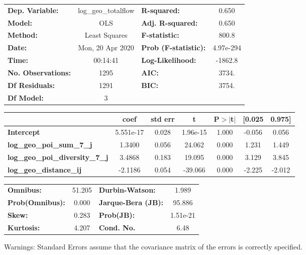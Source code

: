 \begin{center}
\begin{tabular}{lclc}
\toprule
\textbf{Dep. Variable:}                 & log\_geo\_totalflow & \textbf{  R-squared:         } &     0.650   \\
\textbf{Model:}                         &         OLS         & \textbf{  Adj. R-squared:    } &     0.650   \\
\textbf{Method:}                        &    Least Squares    & \textbf{  F-statistic:       } &     800.8   \\
\textbf{Date:}                          &   Mon, 20 Apr 2020  & \textbf{  Prob (F-statistic):} & 4.97e-294   \\
\textbf{Time:}                          &       00:14:41      & \textbf{  Log-Likelihood:    } &   -1862.8   \\
\textbf{No. Observations:}              &          1295       & \textbf{  AIC:               } &     3734.   \\
\textbf{Df Residuals:}                  &          1291       & \textbf{  BIC:               } &     3754.   \\
\textbf{Df Model:}                      &             3       & \textbf{                     } &             \\
\bottomrule
\end{tabular}
\begin{tabular}{lcccccc}
                                        & \textbf{coef} & \textbf{std err} & \textbf{t} & \textbf{P$> |$t$|$} & \textbf{[0.025} & \textbf{0.975]}  \\
\midrule
\textbf{Intercept}                      &    5.551e-17  &        0.028     &  1.96e-15  &         1.000        &       -0.056    &        0.056     \\
\textbf{log\_geo\_poi\_sum\_7\_j}       &       1.3400  &        0.056     &    24.062  &         0.000        &        1.231    &        1.449     \\
\textbf{log\_geo\_poi\_diversity\_7\_j} &       3.4868  &        0.183     &    19.095  &         0.000        &        3.129    &        3.845     \\
\textbf{log\_geo\_distance\_ij}         &      -2.1186  &        0.054     &   -39.066  &         0.000        &       -2.225    &       -2.012     \\
\bottomrule
\end{tabular}
\begin{tabular}{lclc}
\textbf{Omnibus:}       & 51.205 & \textbf{  Durbin-Watson:     } &    1.989  \\
\textbf{Prob(Omnibus):} &  0.000 & \textbf{  Jarque-Bera (JB):  } &   95.886  \\
\textbf{Skew:}          &  0.283 & \textbf{  Prob(JB):          } & 1.51e-21  \\
\textbf{Kurtosis:}      &  4.207 & \textbf{  Cond. No.          } &     6.48  \\
\bottomrule
\end{tabular}
\end{center}

Warnings: \newline
 [1] Standard Errors assume that the covariance matrix of the errors is correctly specified.